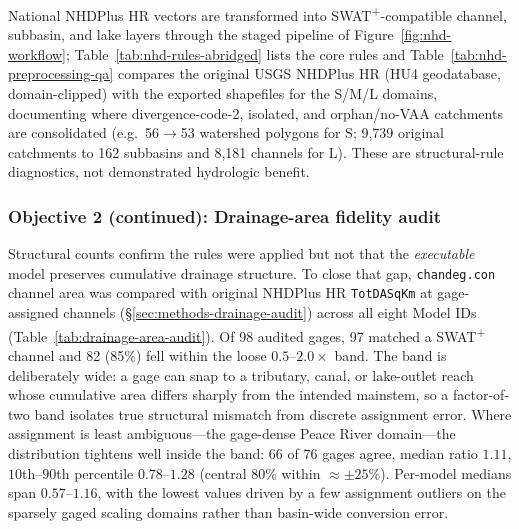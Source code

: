 National NHDPlus HR vectors are transformed into SWAT\textsuperscript{+}-compatible channel, subbasin, and lake layers through the staged pipeline of Figure~\ref{fig:nhd-workflow}; Table~\ref{tab:nhd-rules-abridged} lists the core rules and Table~\ref{tab:nhd-preprocessing-qa} compares the original USGS NHDPlus HR (HU4 geodatabase, domain-clipped) with the exported shapefiles for the S/M/L domains, documenting where divergence-code-2, isolated, and orphan/no-VAA catchments are consolidated (e.g.\ 56$\rightarrow$53 watershed polygons for S; 9{,}739 original catchments to 162 subbasins and 8{,}181 channels for L). These are structural-rule diagnostics, not demonstrated hydrologic benefit.

\subsubsection{Objective 2 (continued): Drainage-area fidelity audit}
\label{sec:results-drainage-audit}

Structural counts confirm the rules were applied but not that the \emph{executable} model preserves cumulative drainage structure. To close that gap, \texttt{chandeg.con} channel area was compared with original NHDPlus HR \texttt{TotDASqKm} at gage-assigned channels (\S\ref{sec:methods-drainage-audit}) across all eight Model IDs (Table~\ref{tab:drainage-area-audit}). Of 98 audited gages, 97 matched a SWAT\textsuperscript{+} channel and 82 (85\%) fell within the loose $0.5$--$2.0\times$ band. The band is deliberately wide: a gage can snap to a tributary, canal, or lake-outlet reach whose cumulative area differs sharply from the intended mainstem, so a factor-of-two band isolates true structural mismatch from discrete assignment error. Where assignment is least ambiguous---the gage-dense Peace River domain---the distribution tightens well inside the band: 66 of 76 gages agree, median ratio $1.11$, $10$th--$90$th percentile $0.78$--$1.28$ (central 80\% within $\approx\pm25\%$). Per-model medians span $0.57$--$1.16$, with the lowest values driven by a few assignment outliers on the sparsely gaged scaling domains rather than basin-wide conversion error.

\begin{table}[htbp]
  \centering
  \caption{Drainage-area fidelity audit: SWAT\textsuperscript{+} \texttt{chandeg.con} area versus original NHDPlus HR \texttt{TotDASqKm} at gage-assigned channels, by catalog Model ID (Objective~2). ``Outliers'' are gage--channel assignment outliers reported separately from the agreement band.}
  \label{tab:drainage-area-audit}
  \footnotesize
  \setlength{\tabcolsep}{4pt}
  \renewcommand{\arraystretch}{1.05}
  \resizebox{\textwidth}{!}{%
  }
\end{table}

